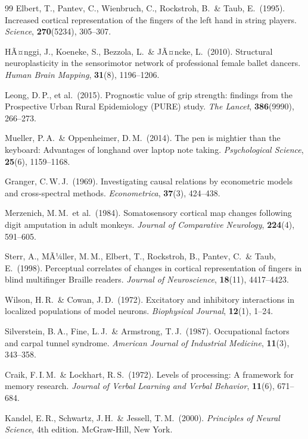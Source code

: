 ﻿\documentclass[12pt,a4paper]{report}
\theoremstyle{plain}
\theoremstyle{definition}
\theoremstyle{remark}
\begin{document}
\begin{thebibliography}{99}
Elbert, T., Pantev, C., Wienbruch, C., Rockstroh, B.\ \& Taub, E.\ (1995).
Increased cortical representation of the fingers of the left hand in string
players. \emph{Science}, \textbf{270}(5234), 305--307.

HÃ¤nggi, J., Koeneke, S., Bezzola, L.\ \& JÃ¤ncke, L.\ (2010). Structural
neuroplasticity in the sensorimotor network of professional female ballet
dancers. \emph{Human Brain Mapping}, \textbf{31}(8), 1196--1206.

Leong, D.\,P., et al.\ (2015). Prognostic value of grip strength: findings
from the Prospective Urban Rural Epidemiology (PURE) study.
\emph{The Lancet}, \textbf{386}(9990), 266--273.

Mueller, P.\,A.\ \& Oppenheimer, D.\,M.\ (2014). The pen is mightier
than the keyboard: Advantages of longhand over laptop note taking.
\emph{Psychological Science}, \textbf{25}(6), 1159--1168.

Granger, C.\,W.\,J.\ (1969). Investigating causal relations by econometric
models and cross-spectral methods. \emph{Econometrica}, \textbf{37}(3), 424--438.

Merzenich, M.\,M.\ et al.\ (1984). Somatosensory cortical map changes
following digit amputation in adult monkeys. \emph{Journal of Comparative
Neurology}, \textbf{224}(4), 591--605.

Sterr, A., MÃ¼ller, M.\,M., Elbert, T., Rockstroh, B., Pantev, C.\
\& Taub, E.\ (1998). Perceptual correlates of changes in cortical
representation of fingers in blind multifinger Braille readers.
\emph{Journal of Neuroscience}, \textbf{18}(11), 4417--4423.

Wilson, H.\,R.\ \& Cowan, J.\,D.\ (1972). Excitatory and inhibitory
interactions in localized populations of model neurons. \emph{Biophysical
Journal}, \textbf{12}(1), 1--24.

Silverstein, B.\,A., Fine, L.\,J.\ \& Armstrong, T.\,J.\ (1987).
Occupational factors and carpal tunnel syndrome. \emph{American Journal
of Industrial Medicine}, \textbf{11}(3), 343--358.

Craik, F.\,I.\,M.\ \& Lockhart, R.\,S.\ (1972). Levels of processing:
A framework for memory research. \emph{Journal of Verbal Learning and
Verbal Behavior}, \textbf{11}(6), 671--684.

Kandel, E.\,R., Schwartz, J.\,H.\ \& Jessell, T.\,M.\ (2000).
\emph{Principles of Neural Science}, 4th edition. McGraw-Hill, New York.


\end{thebibliography}
\end{document}
